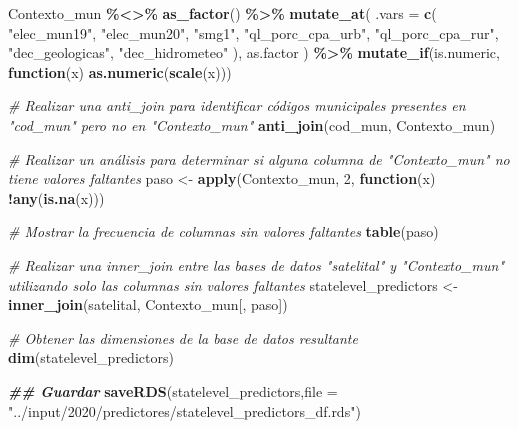 \documentclass[
  12pt,
]{book}
\newenvironment{Shaded}{\begin{snugshade}}{\end{snugshade}}
\newcommand{\AttributeTok}[1]{\textcolor[rgb]{0.13,0.29,0.53}{#1}}
\newcommand{\CommentTok}[1]{\textcolor[rgb]{0.56,0.35,0.01}{\textit{#1}}}
\newcommand{\ControlFlowTok}[1]{\textcolor[rgb]{0.13,0.29,0.53}{\textbf{#1}}}
\newcommand{\DecValTok}[1]{\textcolor[rgb]{0.00,0.00,0.81}{#1}}
\newcommand{\DocumentationTok}[1]{\textcolor[rgb]{0.56,0.35,0.01}{\textbf{\textit{#1}}}}
\newcommand{\FunctionTok}[1]{\textcolor[rgb]{0.13,0.29,0.53}{\textbf{#1}}}
\newcommand{\NormalTok}[1]{#1}
\newcommand{\OtherTok}[1]{\textcolor[rgb]{0.56,0.35,0.01}{#1}}
\newcommand{\SpecialCharTok}[1]{\textcolor[rgb]{0.81,0.36,0.00}{\textbf{#1}}}
\newcommand{\StringTok}[1]{\textcolor[rgb]{0.31,0.60,0.02}{#1}}
\begin{document}
\begin{Shaded}
\begin{Highlighting}[]
\NormalTok{Contexto\_mun }\SpecialCharTok{\%\textless{}\textgreater{}\%} \FunctionTok{as\_factor}\NormalTok{() }\SpecialCharTok{\%\textgreater{}\%}
  \FunctionTok{mutate\_at}\NormalTok{(}
    \AttributeTok{.vars =} \FunctionTok{c}\NormalTok{(}
      \StringTok{"elec\_mun19"}\NormalTok{,}
      \StringTok{"elec\_mun20"}\NormalTok{,}
      \StringTok{"smg1"}\NormalTok{,}
      \StringTok{"ql\_porc\_cpa\_urb"}\NormalTok{,}
      \StringTok{"ql\_porc\_cpa\_rur"}\NormalTok{,}
      \StringTok{"dec\_geologicas"}\NormalTok{,}
      \StringTok{"dec\_hidrometeo"}
\NormalTok{    ),}
\NormalTok{    as.factor}
\NormalTok{  ) }\SpecialCharTok{\%\textgreater{}\%}
  \FunctionTok{mutate\_if}\NormalTok{(is.numeric, }\ControlFlowTok{function}\NormalTok{(x)}
    \FunctionTok{as.numeric}\NormalTok{(}\FunctionTok{scale}\NormalTok{(x)))}

\CommentTok{\# Realizar una anti\_join para identificar códigos municipales presentes en "cod\_mun" pero no en "Contexto\_mun"}
\FunctionTok{anti\_join}\NormalTok{(cod\_mun, Contexto\_mun)}

\CommentTok{\# Realizar un análisis para determinar si alguna columna de "Contexto\_mun" no tiene valores faltantes}
\NormalTok{paso }\OtherTok{\textless{}{-}} \FunctionTok{apply}\NormalTok{(Contexto\_mun, }\DecValTok{2}\NormalTok{, }\ControlFlowTok{function}\NormalTok{(x) }\SpecialCharTok{!}\FunctionTok{any}\NormalTok{(}\FunctionTok{is.na}\NormalTok{(x)))}

\CommentTok{\# Mostrar la frecuencia de columnas sin valores faltantes}
\FunctionTok{table}\NormalTok{(paso)}

\CommentTok{\# Realizar una inner\_join entre las bases de datos "satelital" y "Contexto\_mun" utilizando solo las columnas sin valores faltantes}
\NormalTok{statelevel\_predictors }\OtherTok{\textless{}{-}} \FunctionTok{inner\_join}\NormalTok{(satelital, Contexto\_mun[, paso])}

\CommentTok{\# Obtener las dimensiones de la base de datos resultante}
\FunctionTok{dim}\NormalTok{(statelevel\_predictors)}

\DocumentationTok{\#\# Guardar }
\FunctionTok{saveRDS}\NormalTok{(statelevel\_predictors,}\AttributeTok{file =} \StringTok{"../input/2020/predictores/statelevel\_predictors\_df.rds"}\NormalTok{)}
\end{Highlighting}
\end{Shaded}
\end{document}
